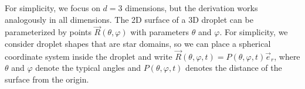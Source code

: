 \begin{appendices}

For simplicity, we focus on $d=3$ dimensions, but the derivation works analogously in all dimensions.
The 2D surface of a 3D droplet can be parameterized by points $\vec{R}(\theta, \varphi)$ with parameters $\theta$ and $\varphi$.
For simplicity, we consider droplet shapes that are star domains, so we can place a spherical coordinate system inside the droplet and write $\vec{R}(\theta, \varphi,t) = P(\theta, \varphi, t)  \vec{e}_r$, where $\theta$ and $\varphi$ denote the typical angles and $P(\theta, \varphi, t)$ denotes the distance of the surface from the origin.


\end{appendices}
